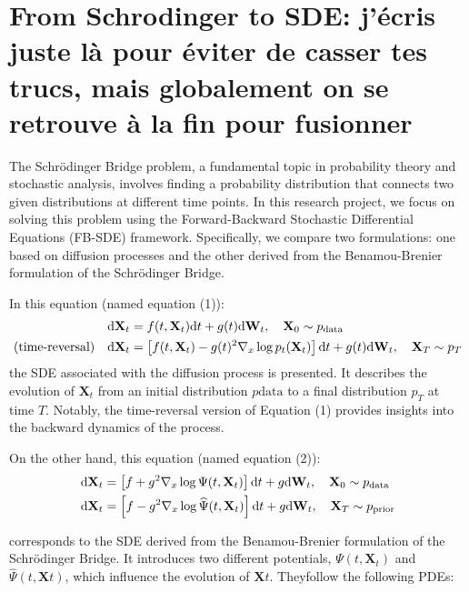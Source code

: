 \documentclass{article}
\begin{document}
\section{From Schrodinger to SDE: j'écris juste là pour éviter de casser tes trucs, mais globalement on se retrouve à la fin pour fusionner}

The Schrödinger Bridge problem, a fundamental topic in probability theory and stochastic analysis, involves finding a probability distribution that connects two given distributions at different time points. In this research project, we focus on solving this problem using the Forward-Backward Stochastic Differential Equations (FB-SDE) framework. Specifically, we compare two formulations: one based on diffusion processes and the other derived from the Benamou-Brenier formulation of the Schrödinger Bridge.

In this equation (named equation (1)):
\begin{equation}\label{eq:sgm1}
\begin{aligned}
\mathrm{d}{\mathbf{X}_t} & = f(t,\mathbf{X}_t)\mathrm{d}{t} + g(t) \mathrm{d}{\mathbf{W}_t}, \quad \mathbf{X}_0 \sim p_\mathrm{data}\\
(\text{time-reversal}) \quad \mathrm{d}{\mathbf{X}_t} & = \left\lbrack f(t,\mathbf{X}_t) - g(t)^2\nabla_x\log p_t(\mathbf{X}_t) \right\rbrack\mathrm{d}{t} + g(t) \mathrm{d}{\mathbf{W}_t}, \quad \mathbf{X}_T \sim p_T
\end{aligned}
\end{equation}
the SDE associated with the diffusion process is presented. It describes the evolution of $\mathbf{X}_t$ from an initial distribution $p\mathrm{data}$ to a final distribution $p_T$ at time $T$. Notably, the time-reversal version of Equation (1) provides insights into the backward dynamics of the process.

On the other hand, this equation (named equation (2)):
$$
\begin{aligned}
    \mathrm{d}\mathbf{X}_t & = \left\lbrack f+g^2\nabla_x\log\Psi(t,\mathbf{X}_t) \right\rbrack\mathrm{d} t + g\mathrm{d} \mathbf{W}_t, \quad \mathbf{X}_0 \sim p_\mathrm{data}\\
    \mathrm{d} \mathbf{X}_t & = \left\lbrack f-g^2\nabla_x\log\widehat\Psi(t,\mathbf{X}_t) \right\rbrack\mathrm{d} t + g \mathrm{d} \mathbf{W}_t, \quad \mathbf{X}_T \sim p_\mathrm{prior}
\end{aligned}
$$

corresponds to the SDE derived from the Benamou-Brenier formulation of the Schrödinger Bridge. It introduces two different potentials, $\Psi(t,\mathbf{X}_t)$ and $\widehat\Psi(t,\mathbf{X}t)$, which influence the evolution of $\mathbf{X}t$. Theyfollow the following PDEs:
\end{document}
